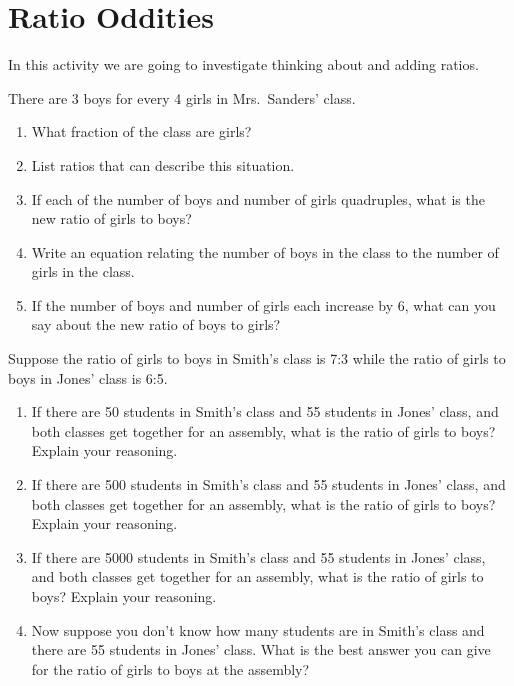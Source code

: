 \newpage
\section{Ratio Oddities}\label{A:ratioOddities}

In this activity we are going to investigate thinking about and adding
ratios.


\begin{prob}
There are 3 boys for every 4 girls in Mrs.\ Sanders' class.
\begin{enumerate}
\item What fraction of the class are girls? 
\item List ratios that can describe this situation. 
\item If each of the number of boys and number of girls quadruples, what is the new ratio of girls to boys?
\item Write an equation relating the number of boys in the class to the number of girls in the class.
\item If the number of boys and number of girls each increase by 6, what can you say about the new ratio of boys to girls?
\end{enumerate}
\end{prob}

\begin{prob}\label{AP:C1}
Suppose the ratio of girls to boys in Smith's class is 7:3 while the
ratio of girls to boys in Jones' class is 6:5.  
\begin{enumerate}
\item If there are 50 students in Smith's class and 55 students in Jones' class, and both
classes get together for an assembly, what is the ratio of girls to
boys? Explain your reasoning.
\item If there are 500 students in Smith's class and 55 students in Jones' class, and both
classes get together for an assembly, what is the ratio of girls to
boys? Explain your reasoning.
\item If there are 5000 students in Smith's class and 55 students in Jones' class, and both
classes get together for an assembly, what is the ratio of girls to
boys? Explain your reasoning.
\item Now suppose you don't know how many students are in Smith's class and there are 55 students in Jones' class. What is the best answer you can give for the ratio of girls to boys at the assembly?
\end{enumerate}
\end{prob}


